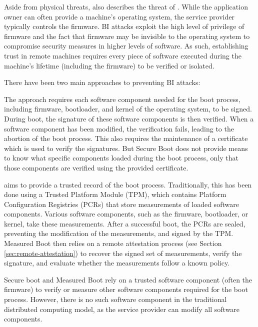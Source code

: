 \begin{description}
    Aside from physical threats, \citeauthor{weis2014protecting} also describes
    the threat of . While the application
    owner can often provide a machine's operating system, the service provider
    typically controls the firmware. BI attacks exploit the high level of
    privilege of firmware and the fact that firmware may be invisible to the
    operating system to compromise security measures in higher levels of
    software. As such, establishing trust in remote machines requires every
    piece of software executed during the machine's lifetime (including the
    firmware) to be verified or isolated.

    There have been two main approaches to preventing BI attacks:

    The  approach requires each software component needed
    for the boot process, including firmware, bootloader, and kernel of the
    operating system, to be signed. During boot, the signature of these software
    components is then verified. When a software component has been modified,
    the verification fails, leading to the abortion of the boot process. This
    also requires the maintenance of a certificate which is used to verify the
    signatures. But Secure Boot does not provide means to know what specific
    components loaded during the boot process, only that those components are
    verified using the provided certificate.

     aims to provide a trusted record of the boot process.
    Traditionally, this has been done using a Trusted Platform Module (TPM),
    which contains Platform Configuration Registries (PCRs) that store
    measurements of loaded software components. Various software components,
    such as the firmware, bootloader, or kernel, take these measurements. After
    a successful boot, the PCRs are sealed, preventing the modification of the
    measurements, and signed by the TPM. Measured Boot then relies on a remote
    attestation process (see Section \ref{sec:remote-attestation}) to recover
    the signed set of measurements, verify the signature, and evaluate whether
    the measurements follow a known policy.

    Secure boot and Measured Boot rely on a trusted software component (often
    the firmware) to verify or measure other software components required for
    the boot process. However, there is no such software component in the
    traditional distributed computing model, as the service provider can modify
    all software components.
\end{description}

